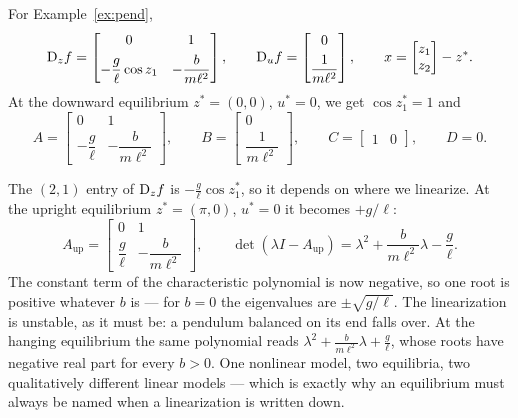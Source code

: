\documentclass[11pt]{article}
\begin{document}
\begin{example}
For Example~\ref{ex:pend},
\[
   \mathrm{D}_{z}f = \begin{bmatrix} 0 & 1\\[4pt]
     -\dfrac{g}{\ell}\cos z_1 & -\dfrac{b}{m\ell^{2}}\end{bmatrix},
   \qquad
   \mathrm{D}_{u}f = \begin{bmatrix}0\\[4pt] \dfrac{1}{m\ell^{2}}\end{bmatrix},
   \qquad
   x = \begin{bmatrix}z_1\\ z_2\end{bmatrix} - z^{*} .
\]
At the downward equilibrium $z^{*}=(0,0)$, $u^{*}=0$, we get $\cos z_1^{*}=1$ and
\[
   A = \begin{bmatrix}0&1\\[3pt] -\dfrac{g}{\ell} & -\dfrac{b}{m\ell^{2}}\end{bmatrix},
   \qquad
   B = \begin{bmatrix}0\\[3pt] \dfrac{1}{m\ell^{2}}\end{bmatrix},
   \qquad C=\begin{bmatrix}1&0\end{bmatrix},\qquad D=0 .
\]
\end{example}

\begin{example}\label{ex:pendup}
The $(2,1)$ entry of $\mathrm{D}_z f$ is $-\frac{g}{\ell}\cos z_1^{*}$, so it depends
on where we linearize. At the upright equilibrium $z^{*}=(\pi,0)$, $u^{*}=0$ it
becomes $+g/\ell$:
\[
   A_{\text{up}} = \begin{bmatrix}0&1\\[3pt] \dfrac{g}{\ell} & -\dfrac{b}{m\ell^{2}}\end{bmatrix},
   \qquad
   \det(\lambda I-A_{\text{up}}) = \lambda^{2}+\frac{b}{m\ell^{2}}\lambda-\frac{g}{\ell}.
\]
The constant term of the characteristic polynomial is now negative, so one root is
positive whatever $b$ is --- for $b=0$ the eigenvalues are $\pm\sqrt{g/\ell}$.
The linearization is unstable, as it must be: a pendulum balanced on its end falls
over. At the hanging equilibrium the same polynomial reads
$\lambda^{2}+\frac{b}{m\ell^{2}}\lambda+\frac{g}{\ell}$, whose roots have negative
real part for every $b>0$. One nonlinear model, two equilibria, two qualitatively
different linear models --- which is exactly why an equilibrium must always be
named when a linearization is written down.
\end{example}
\end{document}
